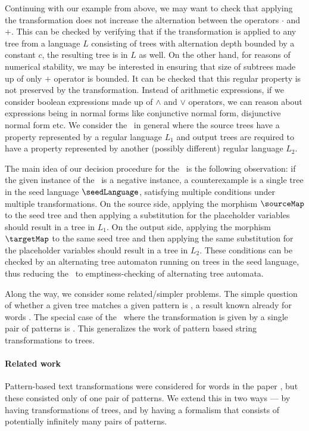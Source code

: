 Continuing with our example from above, we may want to check that applying the transformation does not increase the alternation between the operators $\cdot$ and $+$. This can be checked by verifying that if the transformation is applied to any tree from a language $L$ consisting of trees with alternation depth bounded by a constant $c$, the resulting tree is in $L$ as well. On the other hand, for reasons of numerical stability, we may be interested in ensuring that size of subtrees made up of only $+$ operator is bounded. It can be checked that this regular property is not preserved by the transformation. Instead of arithmetic expressions, if we consider boolean expressions made up of $\land$ and $\lor$ operators, we can reason about expressions being in normal forms like conjunctive normal form, disjunctive normal form etc. We consider the \tcp\ in general where the source trees have a property represented by a regular language $L_1$ and output trees are required to have a property represented by another (possibly different) regular language $L_2$.

The main idea of our decision procedure for the \tcp\ is the following observation: if the given instance of the \tcp\ is a negative instance, a counterexample is a single tree in the seed language $\seedLanguage$, satisfying multiple conditions under multiple transformations. On the source side, applying the morphism $\sourceMap$ to the seed tree and then applying a substitution for the placeholder variables should result in a tree in $L_1$. On the output side, applying the morphism $\targetMap$ to the same seed tree and then applying the same substitution for the placeholder variables should result in a tree in $L_2$. These conditions can be checked by an alternating tree automaton running on trees in the seed language, thus reducing the \tcp\ to emptiness-checking of alternating tree automata.

Along the way, we consider some related/simpler problems. The simple question of whether a given tree matches a given pattern is \npc, a result known already for words \cite{tata}. The special case of the \tcp\ where the transformation is given by a single pair of patterns is \exptc. This generalizes the work of pattern based string transformations \cite{AMP2022} to trees.

\paragraph*{Related work}
Pattern-based text transformations were considered for words in the paper \cite{AMP2022}, but these consisted only of one pair of patterns. We extend this in two ways --- by having  transformations of trees, and by having a formalism that consists of potentially infinitely many  pairs of patterns. 

